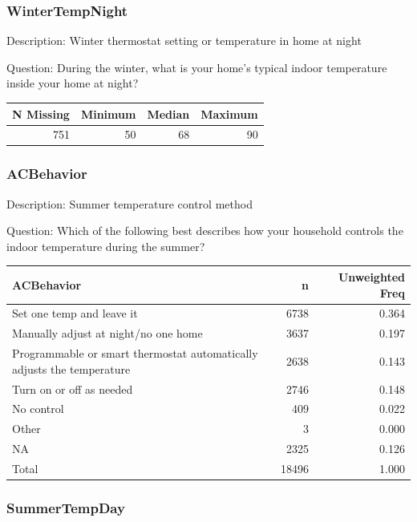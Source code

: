 \documentclass[
]{krantz}
\begin{document}
\hypertarget{wintertempnight}{%
\subsubsection*{WinterTempNight}\label{wintertempnight}}


Description: Winter thermostat setting or temperature in home at night

Question: During the winter, what is your home's typical indoor temperature inside your home at night?

\begin{tabular}[t]{r|r|r|r}
\hline
N Missing & Minimum & Median & Maximum\\
\hline
751 & 50 & 68 & 90\\
\hline
\end{tabular}

\hypertarget{acbehavior}{%
\subsubsection*{ACBehavior}\label{acbehavior}}


Description: Summer temperature control method

Question: Which of the following best describes how your household controls the indoor temperature during the summer?

\begin{tabular}[t]{l|r|r}
\hline
ACBehavior & n & Unweighted Freq\\
\hline
Set one temp and leave it & 6738 & 0.364\\
\hline
Manually adjust at night/no one home & 3637 & 0.197\\
\hline
Programmable or smart thermostat automatically adjusts the temperature & 2638 & 0.143\\
\hline
Turn on or off as needed & 2746 & 0.148\\
\hline
No control & 409 & 0.022\\
\hline
Other & 3 & 0.000\\
\hline
NA & 2325 & 0.126\\
\hline
Total & 18496 & 1.000\\
\hline
\end{tabular}

\hypertarget{summertempday}{%
\subsubsection*{SummerTempDay}\label{summertempday}}
\end{document}
